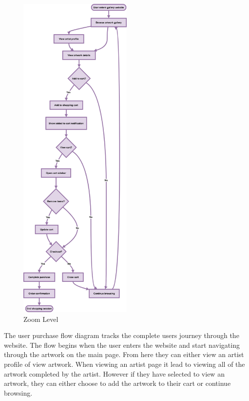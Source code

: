 \documentclass[]{project_final}
\begin{document}
\begin{figure}[ht!]
  \centering
  \includegraphics[width=0.5\textwidth]{AGUserPurchaseFlow.png}
  \vspace*{0.0cm}
  \caption{Zoom Level}
  \label{fig:1}
\end{figure}

The user purchase flow diagram tracks the complete users journey through the website. The flow begins when the user enters the website and start navigating through the artwork on the main page. From here they can either view an artist profile of view artwork. When viewing an artist page it lead to viewing all of the artwork completed by the artist. However if they have selected to view an artwork, they can either choose to add the artwork to their cart or continue browsing.
\end{document}
